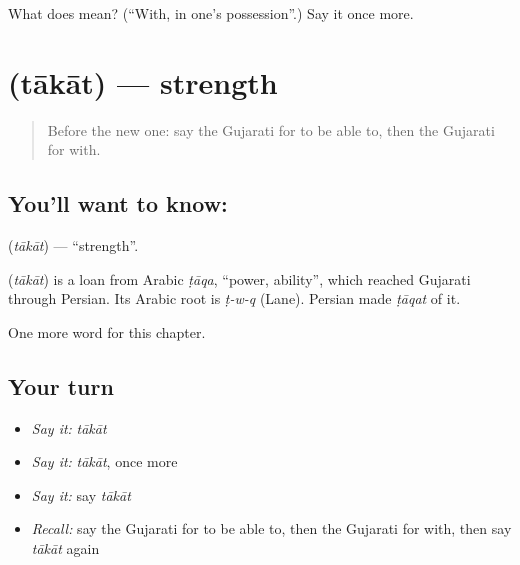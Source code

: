 \begin{tcolorbox}[breakable,colback=teal!4,colframe=teal!35!black,title={Before you move on}]
What does  mean? (\textquotedblleft{}With, in one's possession\textquotedblright{}.) Say it once more.
\end{tcolorbox}
\section[\texorpdfstring{\gu{તાકાત} (tākāt)}{તાકાત (tākāt)}]{ (tākāt) — strength}

\label{lesson:GU-C102-takat}



\begin{quote}
Before the new one: say the Gujarati for to be able to, then the Gujarati for with.
\end{quote}

\subsection*{You'll want to know: }
\textbf{} (\emph{tākāt}) — \textquotedblleft{}strength\textquotedblright{}.

\begin{cousinweb}
\textbf{} (\emph{tākāt}) is a loan from Arabic \emph{ṭāqa}, \textquotedblleft{}power, ability\textquotedblright{}, which reached Gujarati through Persian. Its Arabic root is \emph{ṭ-w-q} (Lane). Persian made \emph{ṭāqat} of it.
\end{cousinweb}

\begin{grammarlens}[title={What you've built}]
One more word for this chapter.
\end{grammarlens}

\subsection*{Your turn}
\begin{itemize}
\raggedright
  \item \emph{Say it:} \emph{tākāt}
  \item \emph{Say it:} \emph{tākāt}, once more
  \item \emph{Say it:} say \emph{tākāt}
  \item \emph{Recall:} say the Gujarati for to be able to, then the Gujarati for with, then say \emph{tākāt} again
\end{itemize}

